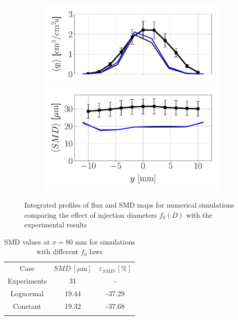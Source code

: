 \begin{figure}[ht]
\begin{subfigure}[b]{0.4\textwidth}
	\flushleft
   \includegraphics[scale=0.35]{./part2_developments/figures_ch6_lagrangian_JICF/params_f0/profiles/flux_along_y}\\
   \vspace{-0.16in}
   \includegraphics[scale=0.35]{./part2_developments/figures_ch6_lagrangian_JICF/params_f0/profiles/SMD_along_y}
\end{subfigure}

\caption{Integrated profiles of flux and SMD maps for numerical simulations comparing the effect of injection diameters $f_0 \left( D \right)$ with the experimental results}
\label{fig:profiles_LGS_JICF_f0}
\end{figure}

\begin{table}[!h]
\centering
\caption{SMD values at $x = 80$ mm for simulations with different $f_0$ laws}
\begin{tabular}{ccc}
\thickhline
Case & $SMD~\left[\mu \mathrm{m} \right]$ & $\varepsilon_{SMD}~\left[\% \right]$ \\
\thickhline
Experiments & 31 & - \\
Lognormal & 19.44 & -37.29 \\
Constant & 19.32 & -37.68 \\
\thickhline
\end{tabular}
\label{tab:SMD_deviations_f0}
\end{table}




